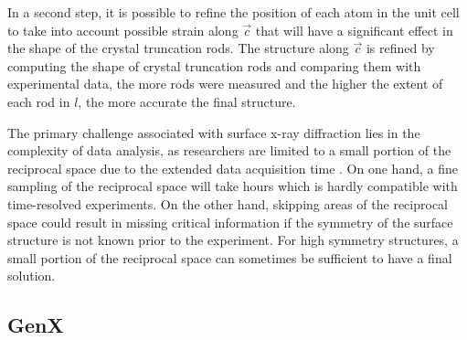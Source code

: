 In a second step, it is possible to refine the position of each atom in the unit cell to take into account possible strain along $\vec{c}$ that will have a significant effect in the shape of the crystal truncation rods.
The structure along $\vec{c}$ is refined by computing the shape of crystal truncation rods and comparing them with experimental data, the more rods were measured and the higher the extent of each rod in $l$, the more accurate the final structure.

The primary challenge associated with surface x-ray diffraction lies in the complexity of data analysis, as researchers are limited to a small portion of the reciprocal space due to the extended data acquisition time \parencite{Gustafson2014}.
On one hand, a fine sampling of the reciprocal space will take hours which is hardly compatible with time-resolved experiments.
On the other hand, skipping areas of the reciprocal space could result in missing critical information if the symmetry of the surface structure is not known prior to the experiment.
For high symmetry structures, a small portion of the reciprocal space can sometimes be sufficient to have a final solution.

\subsection{GenX} \label{sec:GenX}